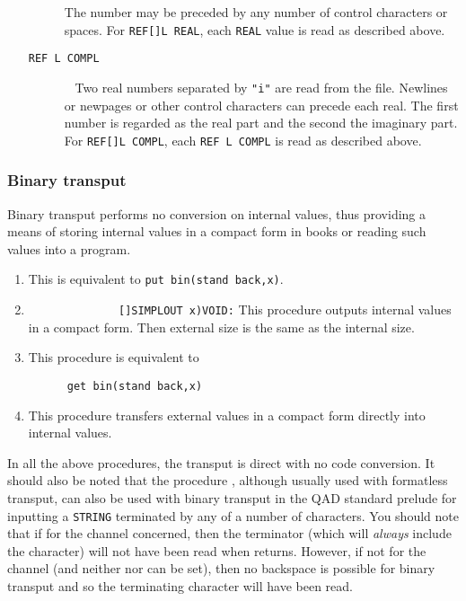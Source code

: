 \begin{enumerate}
\begin{description}
\begin{itemize}
\end{itemize}
The number may be preceded by any number of control characters or
spaces. For \verb|REF[]L REAL|, each \verb|REAL| value is read as
described above.
\item[\texttt{REF L COMPL}]\ \newline
Two real numbers separated by \verb|"i"| are read
from the file. Newlines or newpages or other control characters can
precede each real. The first number is regarded as the real part and
the second the imaginary part. For \verb|REF[]L COMPL|, each
\verb|REF L COMPL| is read as described above.
\end{description}
\end{enumerate}

\subsubsection*{Binary transput}
Binary transput performs no conversion on internal values, thus
providing a means of storing internal values in a compact form in
books or reading such values into a program.
\begin{enumerate}
\item {}\newline
This is equivalent to \verb|put bin(stand back,x)|.
\item {}\newline
\verb|              []SIMPLOUT x)VOID:|\newline
This procedure outputs internal values in a compact form. Then
external size is the same as the internal size.
\item {}\newline
This procedure is equivalent to
\begin{verbatim}
      get bin(stand back,x)
\end{verbatim}
\item {}\newline
This procedure transfers external values in a compact form directly
into internal values.
\end{enumerate}
In all the above procedures, the transput is direct with no code
conversion. It should also be noted that the procedure
, although usually used with formatless transput, can
also be used with binary transput in the QAD standard prelude for
inputting a \verb|STRING| terminated by any of a number of
characters. You should note that if  for the channel
concerned, then the terminator (which will \textit{always} include
the  character) will not have been read when 
returns. However, if not  for the channel (and neither
 nor  can be set), then no backspace is
possible for binary transput and so the terminating character will
have been read.

